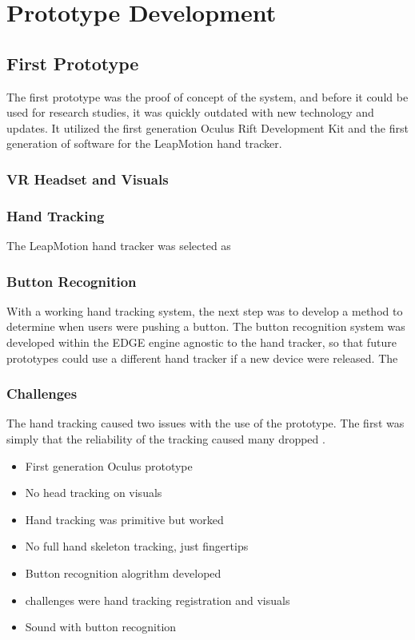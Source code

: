 \section{Prototype Development}

\subsection{First Prototype}

The first prototype was the proof of concept of the system, and before it could be used for research studies, it was quickly outdated with new technology and updates.
It utilized the first generation Oculus Rift Development Kit and the first generation of software for the LeapMotion hand tracker.

\subsubsection{VR Headset and Visuals}

\subsubsection{Hand Tracking}

The LeapMotion hand tracker was selected as 

\subsubsection{Button Recognition}

With a working hand tracking system, the next step was to develop a method to determine when users were pushing a button.
The button recognition system was developed within the EDGE engine agnostic to the hand tracker, so that future prototypes could use a different hand tracker if a new device were released.
The 

\subsubsection{Challenges}

The hand tracking caused two issues with the use of the prototype.
The first was simply that the reliability of the tracking caused many dropped .

\begin{itemize}
    \item First generation Oculus prototype
    \item No head tracking on visuals
    \item Hand tracking was primitive but worked
    \item No full hand skeleton tracking, just fingertips
    \item Button recognition alogrithm developed
    \item challenges were hand tracking registration and visuals
    \item Sound with button recognition
\end{itemize}


